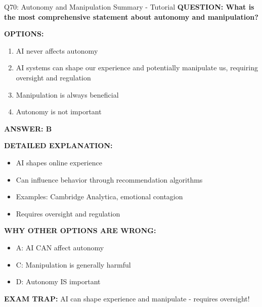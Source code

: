 \documentclass[8pt]{beamer}
\begin{document}
	\begin{frame}{Q70: Autonomy and Manipulation Summary - Tutorial}
		\fontsize{6.5}{7.5}\selectfont
		\textbf{QUESTION: What is the most comprehensive statement about autonomy and manipulation?}
		
		\vspace{0.1cm}
		\textbf{OPTIONS:}
		\begin{enumerate}
			\item AI never affects autonomy
			\item AI systems can shape our experience and potentially manipulate us, requiring oversight and regulation
			\item Manipulation is always beneficial
			\item Autonomy is not important
		\end{enumerate}
		
		\vspace{0.1cm}
		\textcolor{myblue}{\textbf{ANSWER: B}}
		
		\vspace{0.1cm}
		\textbf{DETAILED EXPLANATION:}
		\begin{itemize}
			\item AI shapes online experience
			\item Can influence behavior through recommendation algorithms
			\item Examples: Cambridge Analytica, emotional contagion
			\item Requires oversight and regulation
		\end{itemize}
		
		\vspace{0.1cm}
		\textcolor{myred}{\textbf{WHY OTHER OPTIONS ARE WRONG:}}
		\begin{itemize}
			\item \textcolor{myred}{A:} AI CAN affect autonomy
			\item \textcolor{myred}{C:} Manipulation is generally harmful
			\item \textcolor{myred}{D:} Autonomy IS important
		\end{itemize}
		
		\textcolor{myred}{\textbf{EXAM TRAP:}} AI can \textcolor{myblue}{shape experience and manipulate} - requires oversight!
	\end{frame}
	
	
\end{document}
